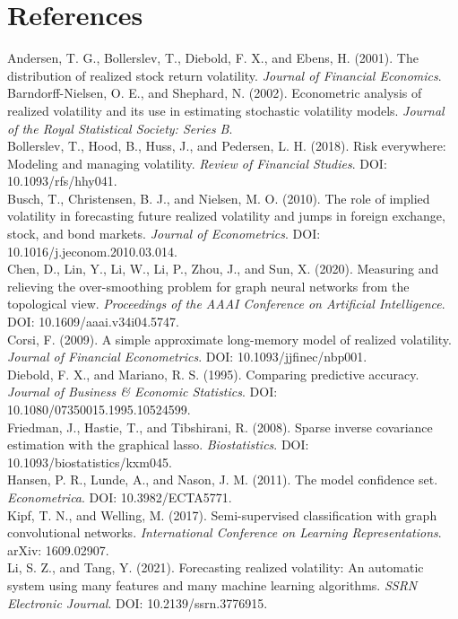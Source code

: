 \documentclass[11pt,a4paper]{article}
\begin{document}
\section*{References}
\small
Andersen, T. G., Bollerslev, T., Diebold, F. X., and Ebens, H. (2001). The distribution of realized stock return volatility. \textit{Journal of Financial Economics}.\\
Barndorff-Nielsen, O. E., and Shephard, N. (2002). Econometric analysis of realized volatility and its use in estimating stochastic volatility models. \textit{Journal of the Royal Statistical Society: Series B}.\\
Bollerslev, T., Hood, B., Huss, J., and Pedersen, L. H. (2018). Risk everywhere: Modeling and managing volatility. \textit{Review of Financial Studies}. DOI: 10.1093/rfs/hhy041.\\
Busch, T., Christensen, B. J., and Nielsen, M. O. (2010). The role of implied volatility in forecasting future realized volatility and jumps in foreign exchange, stock, and bond markets. \textit{Journal of Econometrics}. DOI: 10.1016/j.jeconom.2010.03.014.\\
Chen, D., Lin, Y., Li, W., Li, P., Zhou, J., and Sun, X. (2020). Measuring and relieving the over-smoothing problem for graph neural networks from the topological view. \textit{Proceedings of the AAAI Conference on Artificial Intelligence}. DOI: 10.1609/aaai.v34i04.5747.\\
Corsi, F. (2009). A simple approximate long-memory model of realized volatility. \textit{Journal of Financial Econometrics}. DOI: 10.1093/jjfinec/nbp001.\\
Diebold, F. X., and Mariano, R. S. (1995). Comparing predictive accuracy. \textit{Journal of Business \& Economic Statistics}. DOI: 10.1080/07350015.1995.10524599.\\
Friedman, J., Hastie, T., and Tibshirani, R. (2008). Sparse inverse covariance estimation with the graphical lasso. \textit{Biostatistics}. DOI: 10.1093/biostatistics/kxm045.\\
Hansen, P. R., Lunde, A., and Nason, J. M. (2011). The model confidence set. \textit{Econometrica}. DOI: 10.3982/ECTA5771.\\
Kipf, T. N., and Welling, M. (2017). Semi-supervised classification with graph convolutional networks. \textit{International Conference on Learning Representations}. arXiv: 1609.02907.\\
Li, S. Z., and Tang, Y. (2021). Forecasting realized volatility: An automatic system using many features and many machine learning algorithms. \textit{SSRN Electronic Journal}. DOI: 10.2139/ssrn.3776915.\\
\end{document}

